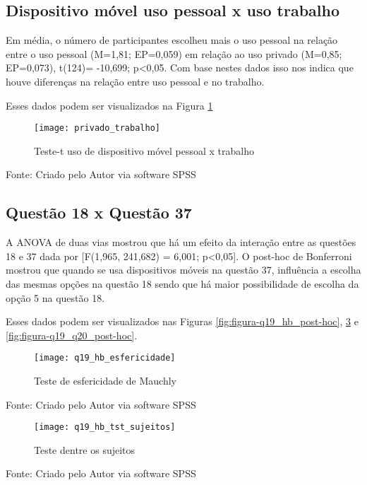 \subsection{Dispositivo móvel uso pessoal x uso trabalho}

Em média, o número de participantes escolheu mais o uso pessoal na  relação entre o uso pessoal (M=1,81; EP=0,059) em relação ao uso privado (M=0,85; EP=0,073), t(124)= -10,699; p<0,05. Com base nestes dados isso nos indica que houve diferenças na relação entre uso pessoal e no trabalho.

Esses dados podem ser visualizados na Figura \ref{fig:figura-privado_trabalho}
\begin{figure}[H]
	\centering	
	\caption{Teste-t uso de dispositivo móvel pessoal x trabalho}
	\texttt{[image: privado\_trabalho]}
	\label{fig:figura-privado_trabalho}
\end{figure}
\vspace{-0.8 cm} \hspace{1.55 cm} Fonte: Criado pelo Autor via software SPSS\newline

\subsection{Questão 18 x Questão 37}

A ANOVA de duas vias mostrou que há um efeito da interação entre as questões 18 e 37 dada por [F(1,965, 241,682) = 6,001; p<0,05].
O post-hoc de Bonferroni mostrou que quando se usa dispositivos móveis na questão 37, influência a escolha das mesmas opções na questão 18 sendo que há maior possibilidade de escolha da opção 5 na questão 18.

Esses dados podem ser visualizados nas Figuras \ref{fig:figura-q19_hb_post-hoc}, \ref{fig:figura-q19_hb_tst_sujeitos} e \ref{fig:figura-q19_q20_post-hoc}.
\begin{figure}[H]
	\centering	
	\caption{Teste de esfericidade de Mauchly}
	\texttt{[image: q19\_hb\_esfericidade]}
	\label{fig:figura-q19_hb_esfericidade}
\end{figure}
\vspace{-0.8 cm} \hspace{1.55 cm} Fonte: Criado pelo Autor via software SPSS

\begin{figure}[H]
	\centering	
	\caption{Teste dentre os sujeitos}
	\texttt{[image: q19\_hb\_tst\_sujeitos]}
	\label{fig:figura-q19_hb_tst_sujeitos}
\end{figure}
\vspace{-0.8 cm} \hspace{1.55 cm} Fonte: Criado pelo Autor via software SPSS

